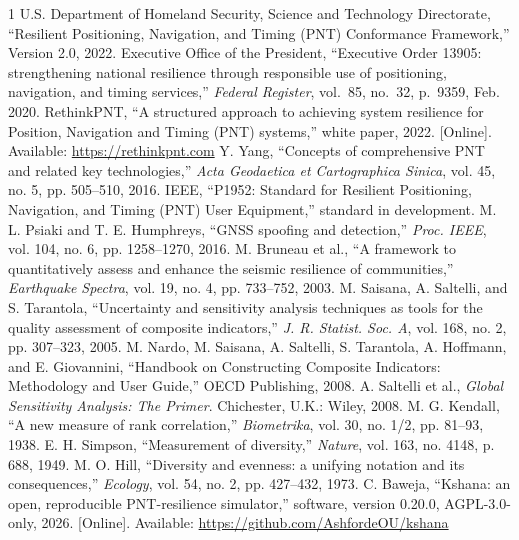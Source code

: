 \documentclass[conference]{IEEEtran}
\begin{document}
\begin{thebibliography}{1}
 U.S. Department of Homeland Security, Science and Technology Directorate, ``Resilient Positioning, Navigation, and Timing (PNT) Conformance Framework,'' Version 2.0, 2022.
 Executive Office of the President, ``Executive Order 13905: strengthening national resilience through responsible use of positioning, navigation, and timing services,'' \emph{Federal Register}, vol.~85, no.~32, p.~9359, Feb. 2020.
 RethinkPNT, ``A structured approach to achieving system resilience for Position, Navigation and Timing (PNT) systems,'' white paper, 2022. [Online]. Available: \url{https://rethinkpnt.com}
 Y. Yang, ``Concepts of comprehensive PNT and related key technologies,'' \emph{Acta Geodaetica et Cartographica Sinica}, vol. 45, no. 5, pp. 505--510, 2016.
 IEEE, ``P1952: Standard for Resilient Positioning, Navigation, and Timing (PNT) User Equipment,'' standard in development.
 M. L. Psiaki and T. E. Humphreys, ``GNSS spoofing and detection,'' \emph{Proc. IEEE}, vol. 104, no. 6, pp. 1258--1270, 2016.
 M. Bruneau et al., ``A framework to quantitatively assess and enhance the seismic resilience of communities,'' \emph{Earthquake Spectra}, vol. 19, no. 4, pp. 733--752, 2003.
 M. Saisana, A. Saltelli, and S. Tarantola, ``Uncertainty and sensitivity analysis techniques as tools for the quality assessment of composite indicators,'' \emph{J. R. Statist. Soc. A}, vol. 168, no. 2, pp. 307--323, 2005.
 M. Nardo, M. Saisana, A. Saltelli, S. Tarantola, A. Hoffmann, and E. Giovannini, ``Handbook on Constructing Composite Indicators: Methodology and User Guide,'' OECD Publishing, 2008.
 A. Saltelli et al., \emph{Global Sensitivity Analysis: The Primer}. Chichester, U.K.: Wiley, 2008.
 M. G. Kendall, ``A new measure of rank correlation,'' \emph{Biometrika}, vol. 30, no. 1/2, pp. 81--93, 1938.
 E. H. Simpson, ``Measurement of diversity,'' \emph{Nature}, vol. 163, no. 4148, p. 688, 1949.
 M. O. Hill, ``Diversity and evenness: a unifying notation and its consequences,'' \emph{Ecology}, vol. 54, no. 2, pp. 427--432, 1973.
 C. Baweja, ``Kshana: an open, reproducible PNT-resilience simulator,'' software, version 0.20.0, AGPL-3.0-only, 2026. [Online]. Available: \url{https://github.com/AshfordeOU/kshana}
\end{thebibliography}
\end{document}

